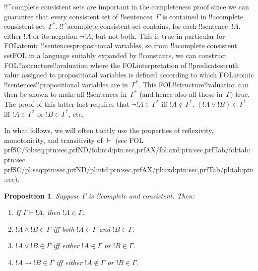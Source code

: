 \documentclass[10pt,a4paper]{article}
\theoremstyle{plain}
\newtheorem{prop}[thm]{Proposition}
\theoremstyle{definition}
\theoremstyle{remark}
\newenvironment{explain}{}{}
\newcommand*{\ollabel}[1]{\label{#1}}
\providecommand{\lif}{\mathbin{\rightarrow}}
\providecommand{\Proves}{\mathrel{\vdash}}
\providecommand{\iftag}[1]{#1}
\providecommand{\tagitem}[1]{\item[#1]}
\providecommand{\tagrefs}[1]{#1}
\begin{document}
\begin{explain}
!!^{complete} consistent sets are important in the completeness proof
since we can guarantee that every consistent set of
!!{sentence}s~$\Gamma$ is contained in !!a{complete} consistent
set~$\Gamma^*$.  !!^a{complete} consistent set contains, for each
!!{sentence}~$!A$, either $!A$ or its negation $\lnot !A$, but not
both. This is true in particular for \iftag{FOL}{atomic
!!{sentence}s}{propositional variables}, so from !!a{complete}
consistent set\iftag{FOL}{ in a language suitably expanded by
!!{constant}s}{}, we can construct
\iftag{FOL}{!!a{structure}}{!!a{valuation}} where the
\iftag{FOL}{interpretation of !!{predicate}s}{truth value assigned to
propositional variables} is defined according to which
\iftag{FOL}{atomic !!{sentence}s}{!!{propositional variable}s} are
in~$\Gamma^*$. This \iftag{FOL}{!!{structure}}{!!{valuation}} can then
be shown to make all !!{sentence}s in~$\Gamma^*$ (and hence also all
those in~$\Gamma$) true. The proof of this latter fact requires that
$\lnot !A \in \Gamma^*$ iff $!A \notin \Gamma^*$, $(!A \lor !B) \in
\Gamma^*$ iff $!A \in \Gamma^*$ or $!B \in \Gamma^*$, etc.
\end{explain}

In what follows, we will often tacitly use the properties of
reflexivity, monotonicity, and transitivity of $\Proves$ (see
\iftag{FOL}{%
  \tagrefs{prfSC/{fol:seq:ptn:sec},prfND/{fol:ntd:ptn:sec},prfAX/{fol:axd:ptn:sec},prfTab/{fol:tab:ptn:sec}}}{%
  \tagrefs{prfSC/{pl:seq:ptn:sec},prfND/{pl:ntd:ptn:sec},prfAX/{pl:axd:ptn:sec},prfTab/{pl:tab:ptn:sec}}}).

\begin{prop}
\ollabel{prop:ccs}
Suppose $\Gamma$ is !!{complete} and consistent. Then:
\begin{enumerate}
\item \ollabel{prop:ccs-prov-in} If $\Gamma \Proves !A$, then $!A \in
  \Gamma$.

\tagitem{prvAnd}{\ollabel{prop:ccs-and} $!A \land !B \in \Gamma$
  iff both $!A \in \Gamma$ and $!B \in \Gamma$.}{}

\tagitem{prvOr}{\ollabel{prop:ccs-or} $!A \lor !B \in \Gamma$ iff
  either $!A \in \Gamma$ or $!B \in \Gamma$.}{}

\tagitem{prvIf}{\ollabel{prop:ccs-if} $!A \lif !B \in \Gamma$ iff
  either $!A \notin \Gamma$ or $!B \in \Gamma$.}{}
\end{enumerate}
\end{prop}
\end{document}

